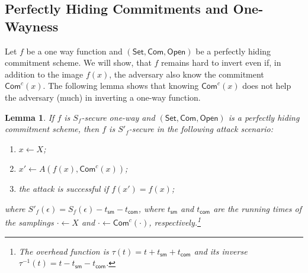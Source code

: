 \documentclass{article}
\newtheorem{lemma}{Lemma}[section]
\newcommand{\setup}[0]{\mathsf{Set}}
\newcommand{\commit}[0]{\mathsf{Com}}
\newcommand{\open}[0]{\mathsf{Open}}
\newcommand{\commitc}[0]{\mathsf{Com}^{c}}
\begin{document}
\subsection{Perfectly Hiding Commitments and One-Wayness}

Let $f$ be a one way function and $(\setup, \commit, \open)$ be a perfectly hiding commitment scheme. We will show, that $f$ remains hard to invert even if, in addition to the image $f(x)$, the adversary also know the commitment $\commitc(x)$. The following lemma shows that knowing $\commitc(x)$ does not help the adversary (much) in inverting a one-way function.

\begin{lemma}
If $f$ is $S_f$-secure one-way and $(\setup, \commit, \open)$ is a perfectly hiding commitment scheme, then $f$ is $S'_f$-secure in the following attack scenario:
\begin{enumerate}
\item $x\gets X$;
\item $x'\gets A(f(x),\commitc(x))$;
\item the attack is successful if $f(x')=f(x)$;
\end{enumerate}
where $S'_f(\epsilon) = S_f(\epsilon) - t_\mathsf{sm} - t_\mathsf{com}$, where $t_\mathsf{sm}$ and $t_\mathsf{com}$ are the running times of the samplings $\cdot\gets X$ and $\cdot\gets \commitc(\cdot)$, respectively.\footnote{The overhead function is $\tau(t)=t + t_\mathsf{sm} + t_\mathsf{com}$ and its inverse $\tau^{-1}(t) = t - t_\mathsf{sm} - t_\mathsf{com}$.}
\end{lemma}
\end{document}
